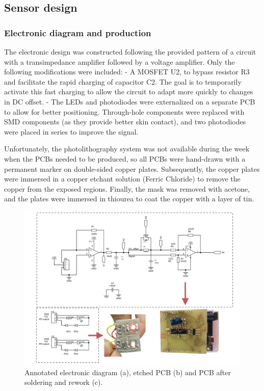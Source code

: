 \documentclass[conference]{IEEEtran}
\begin{document}
   \subsection{Sensor design}
      \subsubsection{Electronic diagram and production}
      The electronic design was constructed following the provided pattern of a circuit with a transimpedance amplifier followed by a voltage amplifier.
      Only the following modifications were included:
      - A MOSFET U2, to bypass resistor R3 and facilitate the rapid charging of capacitor C2. The goal is to temporarily activate this fast charging to allow the circuit to adapt
      more quickly to changes in DC offset.
      - The LEDs and photodiodes were externalized on a separate PCB to allow for better positioning. Through-hole components were replaced with SMD components (as they provide better skin contact),
      and two photodiodes were placed in series to improve the signal.

Unfortunately, the photolithography system was not available during the week when the PCBs needed to be produced, so all PCBs were hand-drawn with a permanent marker on double-sided copper plates.
Subsequently, the copper plates were immersed in a copper etchant solution (Ferric Chloride) to remove the copper from the exposed regions. Finally, the mask was removed with acetone, and the plates were immersed in thiourea to coat the copper with a layer of tin.

      \begin{figure}[!th]
         \centering
         \includegraphics[width=\textwidth]{images/ed2.png}
         \caption{Annotated electronic diagram (a), etched PCB (b) and PCB after soldering and rework (c).}
         \label{fig:circuit}
      \end{figure}
\end{document}
